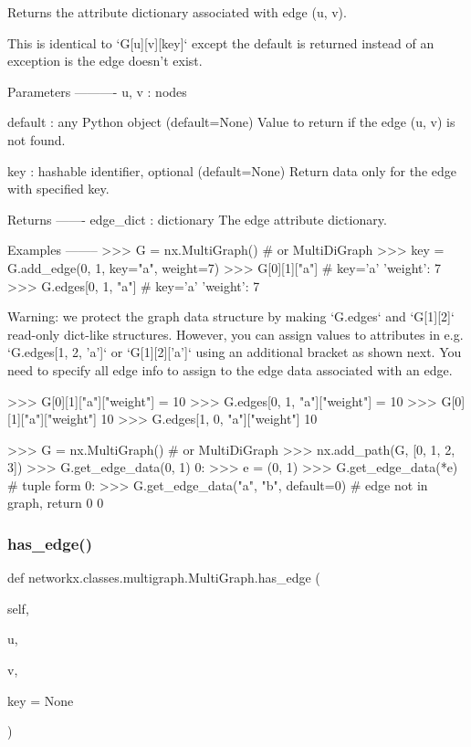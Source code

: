 \begin{DoxyVerb}Returns the attribute dictionary associated with edge (u, v).

This is identical to `G[u][v][key]` except the default is returned
instead of an exception is the edge doesn't exist.

Parameters
----------
u, v : nodes

default :  any Python object (default=None)
    Value to return if the edge (u, v) is not found.

key : hashable identifier, optional (default=None)
    Return data only for the edge with specified key.

Returns
-------
edge_dict : dictionary
    The edge attribute dictionary.

Examples
--------
>>> G = nx.MultiGraph()  # or MultiDiGraph
>>> key = G.add_edge(0, 1, key="a", weight=7)
>>> G[0][1]["a"]  # key='a'
{'weight': 7}
>>> G.edges[0, 1, "a"]  # key='a'
{'weight': 7}

Warning: we protect the graph data structure by making
`G.edges` and `G[1][2]` read-only dict-like structures.
However, you can assign values to attributes in e.g.
`G.edges[1, 2, 'a']` or `G[1][2]['a']` using an additional
bracket as shown next. You need to specify all edge info
to assign to the edge data associated with an edge.

>>> G[0][1]["a"]["weight"] = 10
>>> G.edges[0, 1, "a"]["weight"] = 10
>>> G[0][1]["a"]["weight"]
10
>>> G.edges[1, 0, "a"]["weight"]
10

>>> G = nx.MultiGraph()  # or MultiDiGraph
>>> nx.add_path(G, [0, 1, 2, 3])
>>> G.get_edge_data(0, 1)
{0: {}}
>>> e = (0, 1)
>>> G.get_edge_data(*e)  # tuple form
{0: {}}
>>> G.get_edge_data("a", "b", default=0)  # edge not in graph, return 0
0
\end{DoxyVerb}
 \mbox{\label{classnetworkx_1_1classes_1_1multigraph_1_1MultiGraph_a9c0bf0c1fb96a49acf22228ef5873b22}} 
\subsubsection{\texorpdfstring{has\+\_\+edge()}{has\_edge()}}
{\footnotesize\ttfamily def networkx.\+classes.\+multigraph.\+Multi\+Graph.\+has\+\_\+edge (\begin{DoxyParamCaption}\item[{}]{self,  }\item[{}]{u,  }\item[{}]{v,  }\item[{}]{key = {\ttfamily None} }\end{DoxyParamCaption})}

